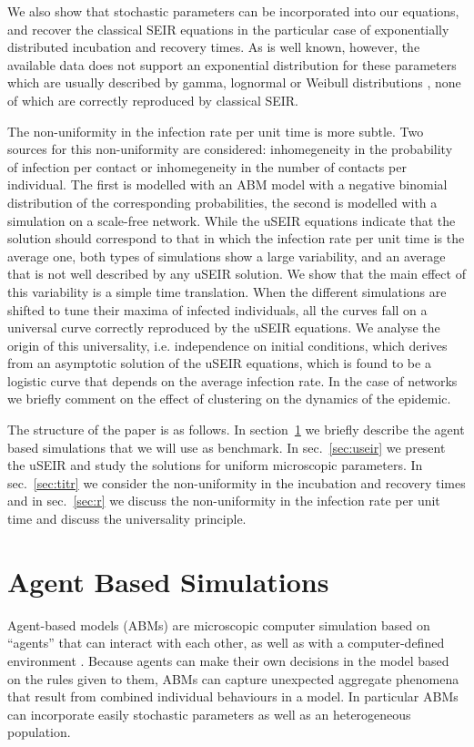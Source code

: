 \documentclass[a4paper,oneside,11pt]{article}
\begin{document}
We also show that stochastic parameters can be incorporated into our equations, and recover the classical SEIR equations in the particular case of exponentially distributed incubation and recovery times. As is well known, however, the available data does not support an exponential distribution for these parameters which are usually described by gamma, lognormal or Weibull distributions \cite{}, none of which are correctly reproduced by classical SEIR.

The non-uniformity in the infection rate per unit time is more subtle. Two sources  for this non-uniformity are considered: inhomegeneity in the probability of infection per contact or inhomegeneity in the number of contacts per individual. The first is modelled with an ABM model with a negative binomial distribution of the corresponding probabilities, the second is modelled with a simulation on a scale-free network. While the uSEIR equations indicate that the solution should correspond to that in which the infection rate per unit time is the average one, both types of simulations show a large variability, and an average that is not well described by any uSEIR solution. We show that the main effect of this variability is a simple time translation. When the different simulations are shifted to tune their maxima of infected individuals, all the curves fall on a universal curve correctly reproduced by the uSEIR equations. We analyse the origin of this universality, i.e. independence on initial conditions, which derives from an asymptotic solution of the uSEIR equations, which is found to be a logistic curve that depends on the average infection rate. In the case of networks we briefly comment on the effect of clustering on the dynamics of the epidemic. 

The structure of the paper is as follows. In section~\ref{sec:ABM} we briefly describe the agent based simulations that we will use as benchmark.
In sec.~\ref{sec:useir} we present the uSEIR and study the solutions for uniform microscopic parameters. In sec.~\ref{sec:titr} we consider the
non-uniformity in the incubation and recovery times and in sec.~\ref{sec:r} we discuss the non-uniformity in the infection rate per unit time and discuss the universality principle.

\section{Agent Based Simulations}
\label{sec:ABM}

Agent-based models (ABMs) are microscopic computer simulation based on ``agents'' that can interact with each other, as well as with a computer-defined environment \cite{Hunter2017}. Because agents can make their own decisions in the model based on the rules given to them, ABMs can capture unexpected aggregate phenomena that result from combined individual behaviours in a model. In particular ABMs can incorporate easily stochastic parameters as well as an heterogeneous population.
\end{document}

